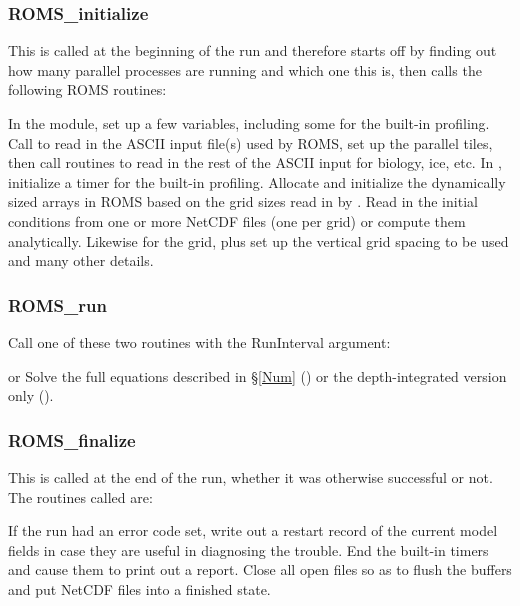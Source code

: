 \subsubsection{ROMS\_initialize}
This is called at the beginning of the run and therefore starts off
by finding out how many parallel processes are running and which one
this is, then calls the following ROMS routines:
\begin{klist}
   In the  module,
    set up a few variables, including some for the built-in profiling.
   Call  to read in the ASCII input
    file(s) used by ROMS, set up the parallel tiles, then call
    routines to read in the rest of the ASCII input for biology, ice,
    etc.
   In , initialize a timer for
    the built-in profiling.
   Allocate and initialize the dynamically sized
    arrays in ROMS based on the grid sizes read in by .
   Read in the initial conditions from one or more NetCDF
    files (one per grid) or compute them analytically. Likewise
    for the grid, plus set up the vertical grid spacing to be
    used and many other details.
\end{klist}

\subsubsection{ROMS\_run}
Call one of these two routines with the RunInterval argument:
\begin{klist}
   or  Solve the full
  equations described in \S\ref{Num} () or the depth-integrated
  version only ().
\end{klist}

\subsubsection{ROMS\_finalize}
This is called at the end of the run, whether it was otherwise
successful or not. The routines called are:
\begin{klist}
   If the run had an error code set, write out a
  restart record of the current model fields in case they are useful in
  diagnosing the trouble.
   End the built-in timers and cause them to print
  out a report.
   Close all open files so as to flush the buffers
  and put NetCDF files into a finished state.
\end{klist}

